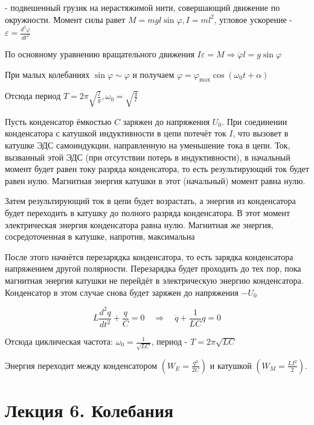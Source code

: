 \documentclass[12pt]{article}
\begin{document}
 - подвешенный грузик на нерастяжимой нити, совершающий движение по окружности.
Момент силы равет $M = m g l \sin \varphi, I = m l^2$, угловое ускорение - $\varepsilon = \frac{d^2 \varphi}{d t^2}$

По основному уравнению вращательного движения $I \varepsilon = M \Longrightarrow \ddot \varphi l = g \sin \varphi$

При малых колебаниях $\sin \varphi \sim \varphi$ и получаем $\varphi = \varphi_{\max} \cos (\omega_0 t + \alpha)$

Отсюда период $T = 2\pi\sqrt{\frac{l}{g}}, \omega_0 = \sqrt{\frac{g}{l}}$

Пусть конденсатор ёмкостью $C$ заряжен до напряжения $U_0$. 
При соединении конденсатора с катушкой индуктивности в цепи потечёт ток $I$, 
что вызовет в катушке ЭДС самоиндукции, направленную на уменьшение тока в цепи. 
Ток, вызванный этой ЭДС (при отсутствии потерь в индуктивности), 
в начальный момент будет равен току разряда конденсатора, то есть результирующий ток будет равен нулю. 
Магнитная энергия катушки в этот (начальный) момент равна нулю.

Затем результирующий ток в цепи будет возрастать, а энергия из конденсатора будет переходить 
в катушку до полного разряда конденсатора. В этот момент электрическая энергия конденсатора равна нулю. 
Магнитная же энергия, сосредоточенная в катушке, напротив, максимальна

После этого начнётся перезарядка конденсатора, то есть зарядка конденсатора напряжением другой полярности. 
Перезарядка будет проходить до тех пор, пока магнитная энергия катушки не перейдёт в электрическую энергию 
конденсатора. Конденсатор в этом случае снова будет заряжен до напряжения $-U_0$

\[
L\frac{d^2q}{dt^2} + \frac{q}{C} = 0 \quad \Longrightarrow \quad \ddot{q} + \frac{1}{LC}q = 0
\]

Отсюда циклическая частота: $\omega_0 = \frac{1}{\sqrt{LC}}$, период - $T = 2\pi\sqrt{LC}$

Энергия переходит между конденсатором $\left(W_E = \frac{q^2}{2C}\right)$ и катушкой $\left(W_M = \frac{LI^2}{2}\right)$.









\section{Лекция 6. Колебания}
\end{document}
